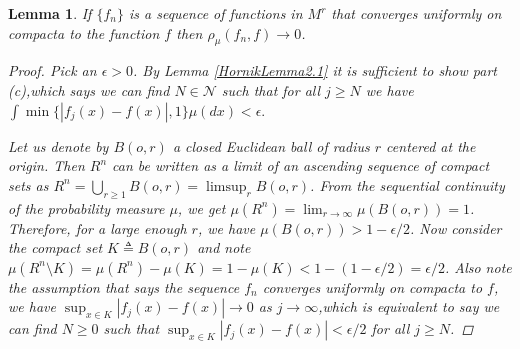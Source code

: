 \documentclass[12pt]{amsart}
\theoremstyle{plain}
\newtheorem{lemma}[thm]{Lemma}
\theoremstyle{definition}
\theoremstyle{remark}
\numberwithin{equation}{section}
\numberwithin{thm}{section}
\begin{document}
\begin{lemma}\label{HornikLemma2.2}
    If $\{f_n\}$ is a sequence of functions in $M^r$ that converges uniformly on compacta to the function $f$ then $\rho_\mu(f_n,f) \to 0$.
    \begin{proof}

        Pick an $\epsilon >0$. By Lemma \ref{HornikLemma2.1} it is sufficient to show part (c),which says we can find $N \in \mathcal{N}$ such that for all $j \geq N$ we have $\int \min\{ |f_j(x)-f(x)|,1\}\mu(dx) < \epsilon.$ 
        
        Let us denote by $B(o,r)$ a closed Euclidean ball of radius $r$ centered at the origin. Then $R^n$ can be written as a limit of an ascending sequence of compact sets as $R^n = \bigcup_{r \geq 1} B(o,r)=\limsup_r B(o,r)$. From the sequential continuity of the probability measure $\mu$, we get $\mu(R^n) = \lim_{r \to \infty} \mu(B(o,r)) = 1$. Therefore, for a large enough $r$, we have $\mu(B(o,r)) > 1 -\epsilon/2$. Now consider the compact set $K \triangleq B(o,r)$ and note $\mu(R^n\setminus K)=\mu(R^n)-\mu(K)=1-\mu(K) < 1- (1-\epsilon/2) = \epsilon/2$. 
        Also note the assumption that says the sequence $f_n$ converges uniformly on compacta to $f$, we have $\sup_{x \in K} |f_j(x)-f(x)| \to 0$ as $j \to \infty$,which is equivalent to say we can find $N \geq 0$ such that $\sup_{x \in K} |f_j(x)-f(x)| < \epsilon/2$ for all $j \geq N$. 


\end{proof}
\end{lemma}
\end{document}
